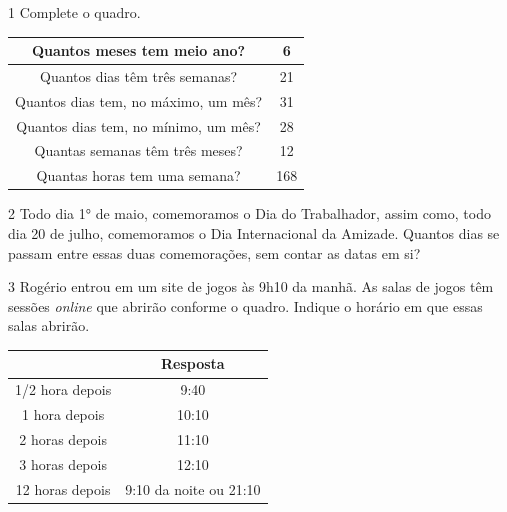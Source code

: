 \num{1} Complete o quadro.

\begin{table}[H]
\centering
\begin{tabular}{|c|c|}
\hline
Quantos meses tem meio ano?          & {\color[HTML]{EB3597} 6}   \\ \hline
Quantos dias têm três semanas?       & {\color[HTML]{EB3597} 21}  \\ \hline
Quantos dias tem, no máximo, um mês? & {\color[HTML]{EB3597} 31}  \\ \hline
Quantos dias tem, no mínimo, um mês? & {\color[HTML]{EB3597} 28}  \\ \hline
Quantas semanas têm três meses?      & {\color[HTML]{EB3597} 12}  \\ \hline
Quantas horas tem uma semana?        & {\color[HTML]{EB3597} 168} \\ \hline
\end{tabular}
\end{table}

\num{2} Todo dia 1° de maio, comemoramos o Dia do Trabalhador,
assim como, todo dia 20 de julho, comemoramos o
Dia Internacional da Amizade. Quantos dias se passam entre essas duas
comemorações, sem contar as datas em si?


\num{3} Rogério entrou em um site de jogos às 9h10 da manhã. As salas de jogos têm sessões \emph{online} que abrirão conforme o quadro. Indique o horário em que essas salas abrirão.



\begin{table}[H]
\centering
\begin{tabular}{|c|c|}
\hline
                & Resposta                                      \\ \hline
1/2 hora depois & {\color[HTML]{EB3597} 9:40}                   \\ \hline
1 hora depois   & {\color[HTML]{EB3597} 10:10}                  \\ \hline
2 horas depois  & {\color[HTML]{EB3597} 11:10}                  \\ \hline
3 horas depois  & {\color[HTML]{EB3597} 12:10}                  \\ \hline
12 horas depois & {\color[HTML]{EB3597} 9:10 da noite ou 21:10} \\ \hline
\end{tabular}
\end{table}

